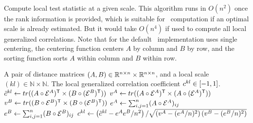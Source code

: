 \documentclass[11pt]{article}
\begin{document}
\clearpage

\begin{algorithm}
\caption{Compute local test statistic at a given scale. This algorithm runs in $O(n^2)$ once the rank information is provided, which is suitable for \Mgc~computation if an optimal scale is already estimated. But it would take $O(n^4)$ if used to compute all local generalized correlations. Note that for the default \Mgc~implementation uses single centering, the centering function centers $A$ by column and $B$ by row, and the sorting function sorts $A$ within column and $B$ within row.}
\label{alg:1scale}
\begin{algorithmic}[1]
\Require A pair of distance matrices $(A, B) \in \mathbb{R}^{n \times n} \times \mathbb{R}^{n \times n}$, and a  local scale $(kl) \in \mathbb{N} \times \mathbb{N}$.
\Ensure The local generalized correlation coefficient $c^{kl} \in [-1,1]$.
 
  
\State $\tilde{c}^{kl} \leftarrow tr((A \circ \mathcal{E}^{A})^{\mathsf{T}} \times (B \circ (\mathcal{E}^{B})^{\mathsf{T}}))$ 
\State $v^{A} \leftarrow tr((A \circ \mathcal{E}^{A})^{\mathsf{T}} \times (A \circ (\mathcal{E}^{A})^{\mathsf{T}}))$ 
\State $v^{B} \leftarrow tr((B \circ \mathcal{E}^{B})^{\mathsf{T}} \times (B \circ (\mathcal{E}^{B})^{\mathsf{T}}))$
\State $e^{A} \leftarrow \sum_{i,j=1}^{n}(A \circ \mathcal{E}^{A})_{ij}$ 
\State $e^{B} \leftarrow \sum_{i,j=1}^{n}(B \circ \mathcal{E}^{B})_{ij}$
\State $c^{kl} \leftarrow \left(\tilde{c}^{kl}-e^{A}e^{B}/n^2\right)/\sqrt{\left(v^{A}-(e^{A}/n)^2 \right) \left(v^{B}-(e^{B}/n)^2\right)}$  

\EndFunction
\end{algorithmic}
\end{algorithm} 

\clearpage
\end{document}
